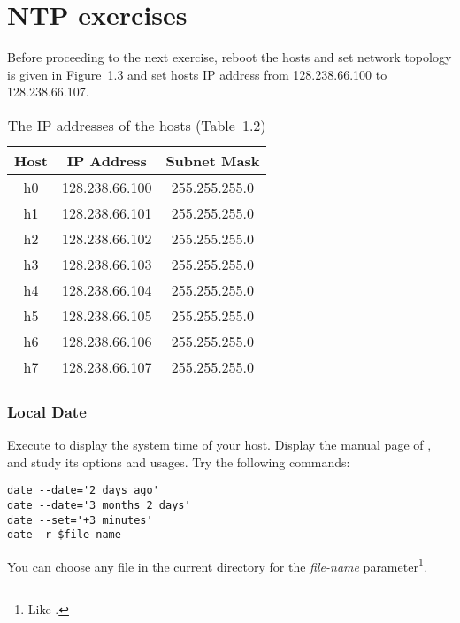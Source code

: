\documentclass{../UTNetLab}
\begin{document}
\part{NTP exercises}
Before proceeding to the next exercise, reboot the hosts and set network topology is given in \hyperref[fig:1.3]{Figure~1.3} and set hosts IP address from 128.238.66.100 to 128.238.66.107.
\begin{center}
    \begin{minipage}{0.48\textwidth}
        \begin{flushleft}
            \begin{table}[H]
                \caption{The IP addresses of the hosts (Table~1.2)}
                \centering
                \begin{tabular}{ c c c }
                    \hline \hline
                    Host & IP Address     & Subnet Mask   \\
                    \hline
                    h0   & 128.238.66.100 & 255.255.255.0 \\
                    h1   & 128.238.66.101 & 255.255.255.0 \\
                    h2   & 128.238.66.102 & 255.255.255.0 \\
                    h3   & 128.238.66.103 & 255.255.255.0 \\
                    h4   & 128.238.66.104 & 255.255.255.0 \\
                    h5   & 128.238.66.105 & 255.255.255.0 \\
                    h6   & 128.238.66.106 & 255.255.255.0 \\
                    h7   & 128.238.66.107 & 255.255.255.0 \\
                    \hline \hline
                \end{tabular}
            \end{table}
        \end{flushleft}
    \end{minipage}
\end{center}

\section{Local Date}
Execute  to display the system time of your host.
Display the manual page of , and study its options and usages.
Try the following  commands:

\begin{lstlisting}[emph={$file-name}]
date --date='2 days ago'
date --date='3 months 2 days'
date --set='+3 minutes'
date -r $file-name
    \end{lstlisting}
You can choose any file in the current directory for the \textit{file-name} parameter\footnote{Like .}.
\end{document}
